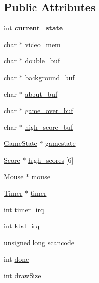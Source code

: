 \subsection*{Public Attributes}
\begin{DoxyCompactItemize}
\item 
int {\bfseries current\+\_\+state}\hypertarget{structMenu_af5a96283eb3fcd309e7669eb11fc0723}{}\label{structMenu_af5a96283eb3fcd309e7669eb11fc0723}

\item 
char $\ast$ \hyperlink{structMenu_a80b884d6ba518e2aaf394d7610ac5ef4}{video\+\_\+mem}
\item 
char $\ast$ \hyperlink{structMenu_a848a585b394d3469c3201ef9a17b5df7}{double\+\_\+buf}
\item 
char $\ast$ \hyperlink{structMenu_a69746dd4ac7c76d1eae9a8e68df1d0c5}{background\+\_\+buf}
\item 
char $\ast$ \hyperlink{structMenu_a613b9a5b6f1901ea7822770066158de5}{about\+\_\+buf}
\item 
char $\ast$ \hyperlink{structMenu_aff9f3dbaf009458436de8073c75e0add}{game\+\_\+over\+\_\+buf}
\item 
char $\ast$ \hyperlink{structMenu_a2852ccdfeadd1fa197b26256aac48464}{high\+\_\+score\+\_\+buf}
\item 
\hyperlink{structGameState}{Game\+State} $\ast$ \hyperlink{structMenu_a8f37305b3ff2904bfb9cb1f91a9b7ce1}{gamestate}
\item 
\hyperlink{structScore}{Score} $\ast$ \hyperlink{structMenu_a9c1889a4d8a16ecb6c557258cf84897f}{high\+\_\+scores} \mbox{[}6\mbox{]}
\item 
\hyperlink{structMouse}{Mouse} $\ast$ \hyperlink{structMenu_a297aca0913c4ffadaf3848b5914e78ee}{mouse}
\item 
\hyperlink{structTimer}{Timer} $\ast$ \hyperlink{structMenu_a6345b63b899f46defb8ad61fdf000c00}{timer}
\item 
int \hyperlink{structMenu_abbc34ac236d2d57a45a856402d8e3f1b}{timer\+\_\+irq}
\item 
int \hyperlink{structMenu_a354e72a664d417dd79557bff5beb1c65}{kbd\+\_\+irq}
\item 
unsigned long \hyperlink{structMenu_ae9efd9d3d5e409c34f0b58b095103c86}{scancode}
\item 
int \hyperlink{structMenu_a457588a82fea9415b58c5b9ee2595e88}{done}
\item 
int \hyperlink{structMenu_a45c1b1aff3e0462d504bc4cd4bb92f51}{draw\+Size}
\item 

\end{DoxyCompactItemize}
